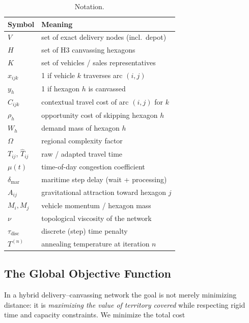 \documentclass[11pt,a4paper,twocolumn]{article}
\begin{document}
\begin{table}[t]
  \centering
  \small
  \caption{Notation.}
  \label{tab:notation}
  \begin{tabular}{@{}ll@{}}
    \toprule
    \textbf{Symbol} & \textbf{Meaning} \\
    \midrule
    $V$ & set of exact delivery nodes (incl.\ depot) \\
    $H$ & set of H3 canvassing hexagons \\
    $K$ & set of vehicles / sales representatives \\
    $x_{ijk}$ & 1 if vehicle $k$ traverses arc $(i,j)$ \\
    $y_h$ & 1 if hexagon $h$ is canvassed \\
    $C_{ijk}$ & contextual travel cost of arc $(i,j)$ for $k$ \\
    $\rho_h$ & opportunity cost of skipping hexagon $h$ \\
    $W_h$ & demand mass of hexagon $h$ \\
    $\Omega$ & regional complexity factor \\
    $T_{ij}$, $\widehat{T}_{ij}$ & raw / adapted travel time \\
    $\mu(t)$ & time-of-day congestion coefficient \\
    $\delta_{\mathrm{mar}}$ & maritime step delay (wait + processing) \\
    $A_{ij}$ & gravitational attraction toward hexagon $j$ \\
    $M_i, M_j$ & vehicle momentum / hexagon mass \\
    $\nu$ & topological viscosity of the network \\
    $\tau_{\mathrm{disc}}$ & discrete (step) time penalty \\
    $T^{(n)}$ & annealing temperature at iteration $n$ \\
    \bottomrule
  \end{tabular}
\end{table}

\subsection{The Global Objective Function}
\label{sec:objective}

In a hybrid delivery--canvassing network the goal is not merely minimizing
distance: it is \emph{maximizing the value of territory covered} while
respecting rigid time and capacity constraints. We minimize the total cost
\end{document}
